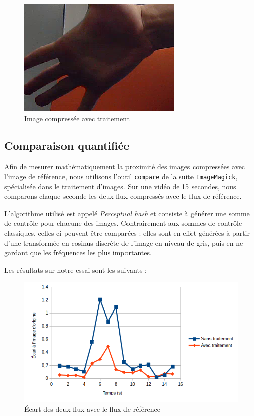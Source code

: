 \documentclass[11pt,a4paper]{article}
\begin{document}
\begin{figure}[H]
  \includegraphics[width=\linewidth]{images/comparaison_zoom_snr.png}
  \caption{Image compressée avec traitement}
\endminipage
\end{figure}


\subsection{Comparaison quantifiée}
Afin de mesurer mathématiquement la proximité des images compressées avec l'image de référence, nous utilisons l'outil \texttt{compare} de la suite \texttt{ImageMagick}, spécialisée dans le traitement d'images.
Sur une vidéo de 15 secondes, nous comparons chaque seconde les deux flux compressés avec le flux de référence.

\bigbreak
L'algorithme utilisé est appelé \textit{Perceptual hash} et consiste à générer une somme de contrôle pour chacune des images.
Contrairement aux sommes de contrôle classiques, celles-ci peuvent être comparées : elles sont en effet générées à partir d'une transformée en cosinus discrète de l'image en niveau de gris, puis en ne gardant que les fréquences les plus importantes.

\bigbreak
Les résultats sur notre essai sont les suivants :

\begin{figure}[H]
\begin{center}
\includegraphics[scale=0.6]{images/comparaison_imagemagick.png}
\end{center}
\caption{Écart des deux flux avec le flux de référence}
\label{}
\end{figure}
\end{document}
